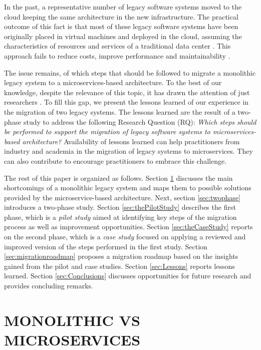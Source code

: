\documentclass[a4paper,twoside]{article}
\begin{document}
In the past, a representative number of legacy software systems moved to the cloud keeping the same architecture in the new infrastructure. The practical outcome of this fact is that most of these legacy software systems have been originally placed in virtual machines and deployed in the cloud, assuming the characteristics of resources and services of a traditional data center \cite{henriqueITNG2019expReport}. This approach fails to reduce costs, improve performance and maintainability \cite{toffetti2017self}.

The issue remains, of which steps that should be followed to migrate a monolithic legacy system to a microservices-based architecture. To the best of our knowledge, despite the relevance of this topic, it has drawn the attention of just researchers \cite{kalske_challenges_2017} \cite{leymann_native_2016} \cite{taibi2017processes}. To fill this gap, we present the lessons learned of our experience in the migration of two legacy systems. The lessons learned are the result of a two-phase study to address the following Research Question (RQ): \textit{Which steps should be performed to support the migration of legacy software systems to microservices-based architecture?} Availability of lessons learned can help practitioners from industry and academia in the migration of legacy systems to microservices. They can also contribute to encourage practitioners to embrace this challenge.

The rest of this paper is organized as follows. Section \ref{sec:MonolithicVsMicroservices} discusses the main shortcomings of a monolithic legacy system and maps them to possible solutions provided by the microservice-based architecture. Next, section \ref{sec:twophase} introduces a two-phase study. Section \ref{sec:thePilotStudy} describes the first phase, which is a \textit{pilot study} aimed at identifying key steps of the migration process as well as improvement opportunities. Section \ref{sec:theCaseStudy} reports on the second phase, which is a \textit{case study} focused on applying a reviewed and improved version of the steps performed in the first study. Section \ref{sec:migrationroadmap} proposes a migration roadmap based on the insights gained from the pilot and case studies. Section \ref{sec:Lessons} reports lessons learned. Section \ref{sec:Conclusions} discusses opportunities for future research and provides concluding remarks.

\section{\uppercase{Monolithic vs Microservices}}
\label{sec:MonolithicVsMicroservices}
\end{document}
